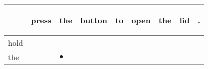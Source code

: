 \documentclass[landscape]{article}
\newcommand{\ssp}{\hspace{2pt}}
\newcommand{\mex}{\cellcolor{g}$\bullet$}
\begin{document}
\noindent\begin{tabular}{|l|p{10pt}|p{10pt}|p{10pt}|p{10pt}|p{10pt}|p{10pt}|p{10pt}|p{10pt}|}
\hline
&\begin{sideways}\cellcolor{ref0}press\hspace{12pt}\end{sideways}&\begin{sideways}\cellcolor{ref1}the\hspace{12pt}\end{sideways}&\begin{sideways}\cellcolor{ref2}button\hspace{12pt}\end{sideways}&\begin{sideways}\cellcolor{ref3}to\hspace{12pt}\end{sideways}&\begin{sideways}\cellcolor{ref4}open\hspace{12pt}\end{sideways}&\begin{sideways}\cellcolor{ref5}the\hspace{12pt}\end{sideways}&\begin{sideways}\cellcolor{ref6}lid\hspace{12pt}\end{sideways}&\begin{sideways}\cellcolor{ref7}.\hspace{12pt}\end{sideways}\\
\hline
\ssp hold \ssp&\hspace{2pt}&\hspace{2pt}&\hspace{2pt}&\hspace{2pt}&\hspace{2pt}&\hspace{2pt}&\hspace{2pt}&\hspace{2pt}\\
\hline
\ssp \cellcolor{ref1}the \ssp&\hspace{2pt}&\hspace{2pt}\mex&\hspace{2pt}&\hspace{2pt}&\hspace{2pt}&\hspace{2pt}&\hspace{2pt}&\hspace{2pt}\\

\end{tabular}
\end{document}
